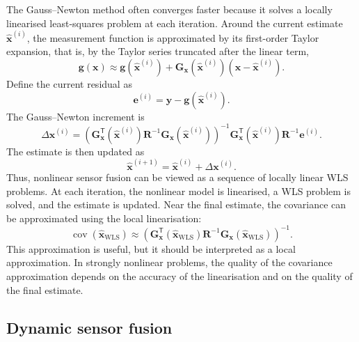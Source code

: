 \documentclass[graybox,envcountchap]{style/SNmono}
\begin{document}
The Gauss--Newton method often converges faster because it solves a locally linearised least-squares problem at each iteration. Around the current estimate $\widehat{\mathbf{x}}^{(i)}$, the measurement function is approximated by its first-order Taylor expansion, that is, by the Taylor series truncated after the linear term,
\begin{equation}
\mathbf{g}(\mathbf{x}) \approx \mathbf{g} \left( \widehat{\mathbf{x}}^{(i)} \right) + \mathbf{G}_{\mathbf{x}} \left( \widehat{\mathbf{x}}^{(i)} \right) \left( \mathbf{x} - \widehat{\mathbf{x}}^{(i)} \right).
\end{equation}
Define the current residual as
\begin{equation}
\mathbf{e}^{(i)} = \mathbf{y} - \mathbf{g} \left( \widehat{\mathbf{x}}^{(i)} \right).
\end{equation}
The Gauss--Newton increment is
\begin{equation}
\Delta \mathbf{x}^{(i)} = \left( \mathbf{G}_{\mathbf{x}}^{\mathsf T} \left( \widehat{\mathbf{x}}^{(i)} \right) \mathbf{R}^{-1} \mathbf{G}_{\mathbf{x}} \left( \widehat{\mathbf{x}}^{(i)} \right) \right)^{-1} \mathbf{G}_{\mathbf{x}}^{\mathsf T} \left( \widehat{\mathbf{x}}^{(i)} \right) \mathbf{R}^{-1} \mathbf{e}^{(i)}.
\end{equation}
The estimate is then updated as
\begin{equation}
\widehat{\mathbf{x}}^{(i+1)} = \widehat{\mathbf{x}}^{(i)} + \Delta \mathbf{x}^{(i)}.
\end{equation}
Thus, nonlinear sensor fusion can be viewed as a sequence of locally linear WLS problems. At each iteration, the nonlinear model is linearised, a WLS problem is solved, and the estimate is updated. Near the final estimate, the covariance can be approximated using the local linearisation:
\begin{equation}
\operatorname{cov} \left( \widehat{\mathbf{x}}_{\mathrm{WLS}} \right) \approx \left(\mathbf{G}_{\mathbf{x}}^{\mathsf T}\left(\widehat{\mathbf{x}}_{\mathrm{WLS}}\right) \mathbf{R}^{-1} \mathbf{G}_{\mathbf{x}} \left( \widehat{\mathbf{x}}_{\mathrm{WLS}} \right)\right)^{-1}.
\end{equation}
This approximation is useful, but it should be interpreted as a local approximation. In strongly nonlinear problems, the quality of the covariance approximation depends on the accuracy of the linearisation and on the quality of the final estimate.


\subsection{Dynamic sensor fusion}
\end{document}
